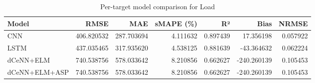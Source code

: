 \begin{table}
\caption{Per-target model comparison for Load}
\begin{tabular}{lrrrrrr}
\toprule
Model & RMSE & MAE & sMAPE (\%) & R² & Bias & NRMSE \\
\midrule
CNN & 406.820532 & 287.703694 & 4.111632 & 0.897439 & 17.356198 & 0.057922 \\
LSTM & 437.035465 & 317.935620 & 4.538125 & 0.881639 & -43.364632 & 0.062224 \\
dCeNN+ELM & 740.538756 & 578.033642 & 8.210856 & 0.662627 & -240.260139 & 0.105453 \\
dCeNN+ELM+ASP & 740.538756 & 578.033642 & 8.210856 & 0.662627 & -240.260139 & 0.105453 \\
\bottomrule
\end{tabular}
\end{table}
